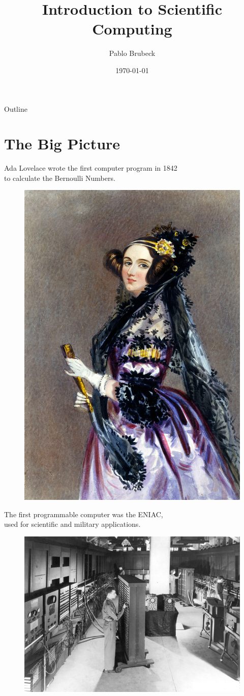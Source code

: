 \documentclass[xcolor={dvipsnames}]{beamer}
\title{Introduction to Scientific Computing}
\author{Pablo Brubeck\inst{}}
\institute[ITESM]
{
  \inst{}
  Department of Physics\\
  Tecnologico de Monterrey
}
\date{\today}
\begin{document}
\begin{frame}
  \titlepage
\end{frame}

\begin{frame}{Outline}
  \tableofcontents
\end{frame}


\section{The Big Picture}

\begin{frame}{Ada Lovelace wrote the first computer program in 1842\\ to calculate the Bernoulli Numbers.}{}
\begin{figure}
\centering
\includegraphics[width=0.4\linewidth]{AdaLovelace}
\label{fig:AdaLovelace}
\end{figure}

\end{frame}

\begin{frame}{The first programmable computer was the ENIAC,\\ used for scientific and military applications.}{}
\begin{figure}
\centering
\includegraphics[width=0.7\linewidth]{ENIAC}
\label{fig:ENIAC}
\end{figure}
\end{frame}
\end{document}
